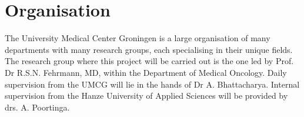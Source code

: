 \chapter{Organisation}
The University Medical Center Groningen is a large organisation of many departments with many research groups, each specialising in their unique fields.
The research group where this project will be carried out is the one led by Prof. Dr R.S.N. Fehrmann, MD, within the Department of Medical Oncology.
Daily supervision from the UMCG will lie in the hands of Dr A. Bhattacharya.
Internal supervision from the Hanze University of Applied Sciences will be provided by drs. A. Poortinga.

